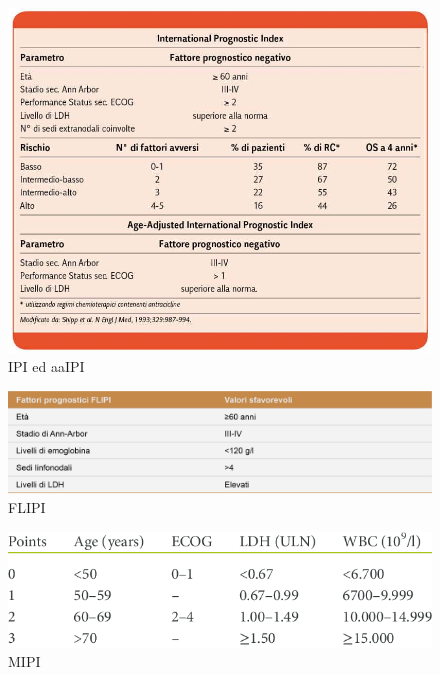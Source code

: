 \begin{figure}[h]
    \begin{center}
    \includegraphics[width=1.0\columnwidth]{img/IPI ed AAIPI.jpeg}
    \end{center}
    \caption[IPI ed aaIPI]{IPI ed aaIPI
    \cite{img18}}

\end{figure}

\begin{figure}[h]
    \begin{center}
    \includegraphics[width=1.0\columnwidth]{img/FLIPI.png}
    \end{center}
    \caption[FLIPI]{FLIPI
    \cite{img19}}

\end{figure}

\begin{figure}[h]
    \begin{center}
    \includegraphics[width=1.0\columnwidth]{img/MIPI.png}
    \end{center}
    \caption[MIPI]{MIPI
    \cite{img20}}

\end{figure}


